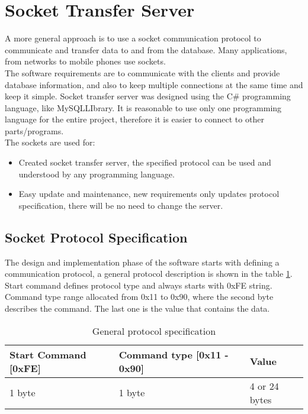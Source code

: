 %
\section{Socket Transfer Server}

A more general approach is to use a socket communication \cite{bib6} protocol to communicate and transfer data to and from the database. Many applications, from networks to mobile phones \cite{bib7} use sockets. \\  The software requirements are to communicate with the clients and provide database information, and also to keep multiple connections at the same time and keep it simple.  Socket transfer server was designed using the C\# programming language, like MySQLLIbrary. It is reasonable to use only one programming language for the entire project, therefore it is easier to connect to other parts/programs. \\ The sockets are used for: 

\begin{itemize}
	\item Created socket transfer server, the specified protocol can be used and understood by any programming language.
	\item Easy update and maintenance, new requirements only updates protocol specification, there will be no need to change the server.
\end{itemize}

\subsection{Socket Protocol Specification}

The design and implementation phase of the software starts with defining a communication protocol, a general protocol description is shown in the table \ref{tab:protocolSpec}. Start command defines protocol type and always starts with 0xFE string. Command type range allocated from 0x11 to 0x90, where the second byte describes the command. The last one is the value that contains the data.

\begin{table}[h]
	\centering
    \begin{tabular}{ | p{4cm} | p{5cm} | p{4cm} | }
    \hline
    \textbf{Start Command} [0xFE] & \textbf{Command type} [0x11 - 0x90] & \textbf{Value}  \\ \hline
    1 byte & 1 byte & 4 or 24 bytes  \\ \hline
    \end{tabular}
	\caption{General protocol specification}
	\label{tab:protocolSpec}
\end{table}

